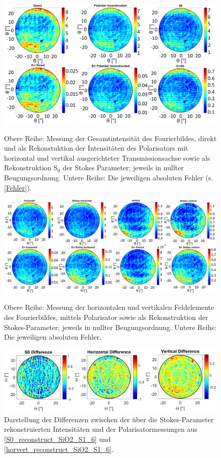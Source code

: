 \begin{figure}[h]
\centering
\includegraphics[width=.75\textwidth]{Bilder/Methodik/S0_reconstruct_SiO2_S1_6}
\caption{Obere Reihe: Messung der Gesamtintensität des Fourierbildes, direkt und als Rekonstuktion der Intensitäten des Polarisators mit horizontal und vertikal ausgerichteter Transmissionsachse sowie als Rekonstruktion S$_0$ der Stokes Parameter; jeweils in nullter Beugungsordnung. Untere Reihe: Die jeweiligen absoluten Fehler (s. \autoref{Fehler}).}
\label{S0_reconstruct_SiO2_S1_6}
\includegraphics[width=1\textwidth]{Bilder/Methodik/horvert_reconstruct_SiO2_S1_6}
\caption{Obere Reihe: Messung der horizontalen und vertikalen Feldelemente des Fourierbildes, mittels Polarisator sowie als Rekonstruktion der Stokes-Parameter; jeweils in nullter Beugungsordnung. Untere Reihe: Die jeweiligen absoluten Fehler.}
\label{horvert_reconstruct_SiO2_S1_6}
\centering
\includegraphics[width=.75\textwidth]{Bilder/Methodik/Diff_reconstruct_SiO2_S1_6}
\caption{Darstellung der Differenzen zwischen der über die Stokes-Parameter rekonstruierten Intensitäten und der Polarisatormessungen aus \autoref{S0_reconstruct_SiO2_S1_6} und \autoref{horvert_reconstruct_SiO2_S1_6}.}
\label{Diff_SiO2_S1_6}
\end{figure}
